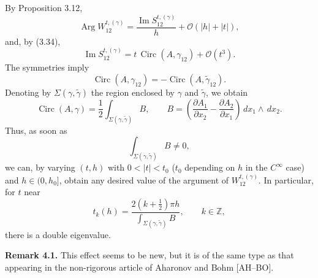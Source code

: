 \documentclass[11pt]{article}
\newcommand{\Z}{\mathbb{Z}}
\newcommand{\Imm}{\operatorname{Im}}
\newcommand{\Argg}{\operatorname{Arg}}
\newcommand{\Circ}{\operatorname{Circ}}
\newcommand{\OO}{\mathcal O}
\newcommand{\dd}{\,d}
\begin{document}
By Proposition 3.12,
\begin{equation}
\Argg W_{12}^{t,(\gamma)}
=\frac{\Imm S_{12}^{t,(\gamma)}}{h}
+\OO(|h|+|t|),
\tag{4.14}
\end{equation}
and, by (3.34),
\begin{equation}
\Imm S_{12}^{t,(\gamma)}
=t\,\Circ(A,\gamma_{12})+\OO(t^3).
\tag{4.15}
\end{equation}
The symmetries imply
\begin{equation}
\Circ(A,\gamma_{12})=-\Circ(A,\widetilde\gamma_{12}).
\tag{4.16}
\end{equation}
Denoting by $\Sigma(\gamma,\widetilde\gamma)$ the region enclosed by $\gamma$ and $\widetilde\gamma$, we obtain
\begin{equation}
\Circ(A,\gamma)
=\frac12\int_{\Sigma(\gamma,\widetilde\gamma)}B,
\qquad
B=\left(
\frac{\partial A_1}{\partial x_2}-
\frac{\partial A_2}{\partial x_1}
\right)\dd x_1\wedge\dd x_2.
\tag{4.17}
\end{equation}
Thus, as soon as
\begin{equation}
\int_{\Sigma(\gamma,\widetilde\gamma)}B\ne0,
\tag{4.18}
\end{equation}
we can, by varying $(t,h)$ with $0<|t|<t_0$ ($t_0$ depending on $h$ in the $C^\infty$ case) and $h\in(0,h_0]$, obtain any desired value of the argument of $W_{12}^{t,(\gamma)}$. In particular, for $t$ near
\begin{equation}
t_k(h)=\frac{2(k+\tfrac12)\pi h}
{\displaystyle\int_{\Sigma(\gamma,\widetilde\gamma)}B},
\qquad k\in\Z,
\tag{4.19}
\end{equation}
there is a double eigenvalue.

\medskip
\noindent\textbf{Remark 4.1.}
This effect seems to be new, but it is of the same type as that appearing in the non-rigorous article of Aharonov and Bohm [AH--BO].
\end{document}
